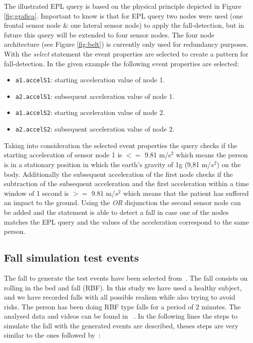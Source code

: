 \documentclass[conference]{IEEEtran}
\theoremstyle{definition}
\begin{document}
The illustrated EPL query is based on the physical principle depicted in 
Figure \ref{fig:grafica}. Important to know is that for EPL query two nodes 
were used (one frontal sensor node \& one lateral sensor node) to apply the 
fall-detection, but in future this query will be extended to four sensor nodes. 
The four node architecture (see Figure \ref{fig:belt}) is currently only used 
for redundancy purposes. With the \textit{select} statement the event properties 
are selected to create a pattern for fall-detection. In the given example the
following event properties are selected:

\begin{itemize}
 \item \texttt{a1.accelS1}: starting acceleration value of node 1.
 \item \texttt{a2.accelS1}: subsequent acceleration value of node 1.
 \item \texttt{a1.accelS2}: starting acceleration value of node 2.
 \item \texttt{a2.accelS2}: subsequent acceleration value of node 2.
\end{itemize}

Taking into consideration the selected event properties the query checks if the 
starting acceleration of sensor node 1 is $<=$ 9.81 m/s$^2$ which means the person 
is in a stationary position in which the earth's gravity of 1g (9,81 m/$s^2$) on 
the body. Additionally the subsequent acceleration of the first node checks if the 
subtraction of the subsequent acceleration and the first acceleration within a 
time window of 1 second is $>=$ 9.81 m/$s^2$ which means that the patient has 
suffered an impact to the ground. Using the \textit{OR} disjunction the second 
sensor node can be added and the statement is able to detect a fall in case one 
of the nodes matches the EPL query and the values of the acceleration correspond 
to the same person. 
 
\subsection{Fall simulation test events} %

The fall to generate the test events have been selected from~\cite{Li2009,Pannurat2014}. 
The fall consists on rolling in the bed and fall (RBF). In this study we have used a 
healthy subject, and we have recorded falls with all possible realism while also
trying to avoid risks. The person has been doing RBF type falls for a period of 2 minutes. The analysed 
data and videos can be found in ~\cite{}. In the following lines the steps to simulate 
the fall with the generated events are described, theses steps are very similar to the 
ones followed by~\cite{colladomachine,colladoTriaxal}:
\end{document}
